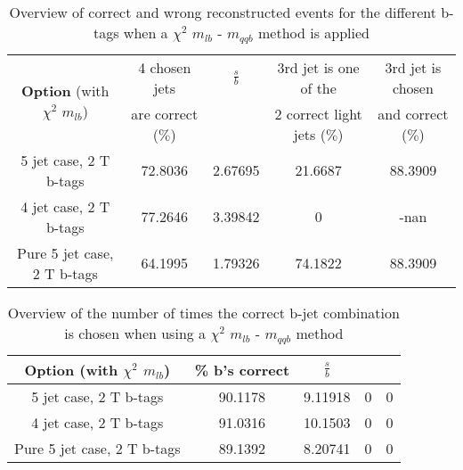  \begin{table}[!h] 
 \begin{tabular}{c|c|c|c|c} 
\multirow{2}{*}{\textbf{Option} (with $\chi^{2}$ $m_{lb}$)} & 4 chosen jets & $\frac{s}{b}$ & 3rd jet is one of the & 3rd jet is chosen \\ & are correct ($\%$)    & 	             & 2 correct light jets ($\%$) &  and correct ($\%$)	  \\ \hline 
 5 jet case,      2 T b-tags              & 72.8036 & 2.67695 & 21.6687 & 88.3909 \\ 
 4 jet case,      2 T b-tags              & 77.2646 & 3.39842 & 0 & -nan \\ 
 Pure 5 jet case, 2 T b-tags              & 64.1995 & 1.79326 & 74.1822 & 88.3909 \\ 
 \end{tabular} 
 \caption{Overview of correct and wrong reconstructed events for the different b-tags when a $\chi^{2}$ $m_{lb}$ - $m_{qqb}$ method is applied} 
 \end{table} 
 
 \begin{table}[!h] 
 \begin{tabular}{c|c|c|c|c} 
 \textbf{Option} (with $\chi^{2}$ $m_{lb}$) & \% b's correct   & $\frac{s}{b}$ &  &  \\ \hline 
 5 jet case,      2 T b-tags              & 90.1178 & 9.11918 & 0 & 0 \\ 
 4 jet case,      2 T b-tags              & 91.0316 & 10.1503 & 0 & 0 \\ 
 Pure 5 jet case, 2 T b-tags              & 89.1392 & 8.20741 & 0 & 0 \\ 
 \end{tabular} 
 \caption{Overview of the number of times the correct b-jet combination is chosen when using a $\chi^{2}$ $m_{lb}$ - $m_{qqb}$ method} 
 \end{table} 
 
